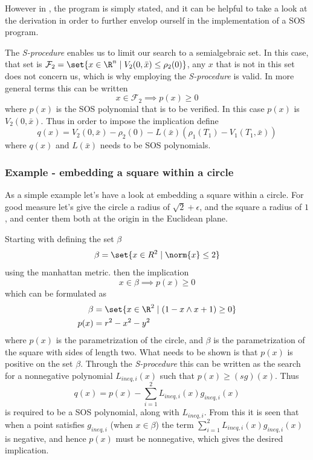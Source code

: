 However in \cite[Majumdar and Tedrake]{majumdarFunnelLibrariesRealtime2017}, the
program is simply stated, and it can be helpful to take a look at the derivation
in order to further envelop ourself in the implementation of a \ac{SOS} program.

The \textit{S-procedure} enables us to limit our search to a semialgebraic set.
In this case, that set is \(\mathcal{F}_2 = \set{x \in \R^n \mid V_2(0,\bar{x})
  \leq \rho_2(0)}\), any \(x\) that is not in this set does not concern us,
which is why employing the \textit{S-procedure} is valid. In more general terms
this can be written
\[
  x \in \mathcal{F}_2 \implies p(x) \geq 0
\]
where \(p(x)\) is the \ac{SOS} polynomial that is to be verified. In this case
\(p(x)\) is \(V_2(0,\bar{x})\). Thus in order to impose the implication define
\[
  q(x) = V_2(0,\bar{x}) - \rho_2(0) - L(\bar{x}) \left( \rho_1(T_1) -
    V_1(T_1,\bar{x}) \right)
\]
where \(q(x)\) and \(L(\bar{x})\) needs to be SOS polynomials.

\subsubsection{Example - embedding a square within a circle}

As a simple example let's have a look at embedding a square within a circle. For
good measure let's give the circle a radius of \(\sqrt{2}+\epsilon\), and the square a
radius of \(1\), and center them both at the origin in the Euclidean plane.

Starting with defining the set \(\beta\)
\[
  \beta = \set{x \in R^2 \mid \norm{x} \leq 2}
\]
using the manhattan metric. then the implication
\[
  x \in \beta \implies p(x) \geq 0
\]
which can be formulated as
\begin{align*}
  \beta &= \set{x \in \R^2 \mid (1 - x \wedge x + 1) \geq 0} \\
  p(x) &= r^2 - x^2 - y^2
\end{align*}
where \(p(x)\) is the parametrization of the circle, and \(\beta\) is the
parametrization of the square with sides of length two. What needs to be shown is that \(p(x)\) is
positive on the set \(\beta\). Through the \textit{S-procedure} this can be
written as the search for a nonnegative polynomial \(L_{ineq,i}(x)\) such that
\(p(x) \geq \left( sg \right)(x)\). Thus
\[
  q(x) = p(x) - \sum_{i=1}^{2}L_{ineq,i}(x)g_{ineq,i}(x)
\]
is required to be a \ac{SOS} polynomial, along with \(L_{ineq,i}\). From this it
is seen that when a point satisfies \(g_{ineq,i}\) (\ie when \(x \in \beta\))
the term \(\sum_{i=1}^{2}L_{ineq,i}(x)g_{ineq,i}(x)\) is negative, and hence
\(p(x)\) must be nonnegative, which gives the desired implication.

